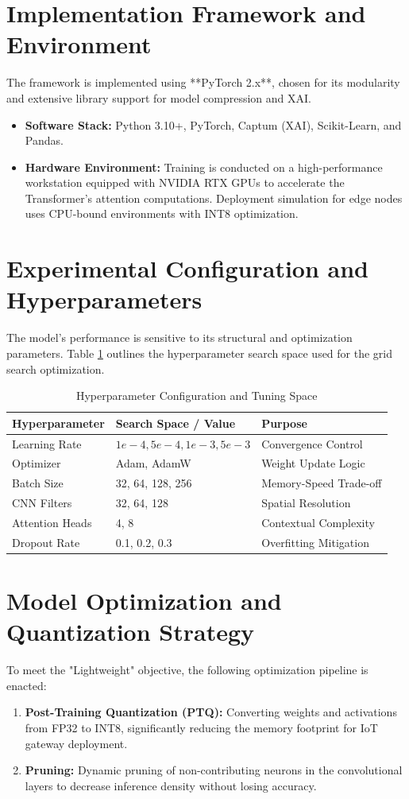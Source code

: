 \documentclass[12pt, a4paper]{report}
\begin{document}
\section{Implementation Framework and Environment}
The framework is implemented using **PyTorch 2.x**, chosen for its modularity and extensive library support for model compression and XAI.
\begin{itemize}
    \item \textbf{Software Stack:} Python 3.10+, PyTorch, Captum (XAI), Scikit-Learn, and Pandas.
    \item \textbf{Hardware Environment:} Training is conducted on a high-performance workstation equipped with NVIDIA RTX GPUs to accelerate the Transformer's attention computations. Deployment simulation for edge nodes uses CPU-bound environments with INT8 optimization.
\end{itemize}

\section{Experimental Configuration and Hyperparameters}
The model's performance is sensitive to its structural and optimization parameters. Table \ref{tab:hyperparameters} outlines the hyperparameter search space used for the grid search optimization.

\begin{table}[h!]
\centering
\caption{Hyperparameter Configuration and Tuning Space}
\label{tab:hyperparameters}
\begin{tabular}{|l|l|l|}
\hline
\textbf{Hyperparameter} & \textbf{Search Space / Value} & \textbf{Purpose} \\ \hline
Learning Rate & $1e-4, 5e-4, 1e-3, 5e-3$ & Convergence Control \\ \hline
Optimizer & Adam, AdamW & Weight Update Logic \\ \hline
Batch Size & 32, 64, 128, 256 & Memory-Speed Trade-off \\ \hline
CNN Filters & 32, 64, 128 & Spatial Resolution \\ \hline
Attention Heads & 4, 8 & Contextual Complexity \\ \hline
Dropout Rate & 0.1, 0.2, 0.3 & Overfitting Mitigation \\ \hline
\end{tabular}
\end{table}

\section{Model Optimization and Quantization Strategy}
To meet the "Lightweight" objective, the following optimization pipeline is enacted:
\begin{enumerate}
    \item \textbf{Post-Training Quantization (PTQ):} Converting weights and activations from FP32 to INT8, significantly reducing the memory footprint for IoT gateway deployment.
    \item \textbf{Pruning:} Dynamic pruning of non-contributing neurons in the convolutional layers to decrease inference density without losing accuracy.
\end{enumerate}
\end{document}
